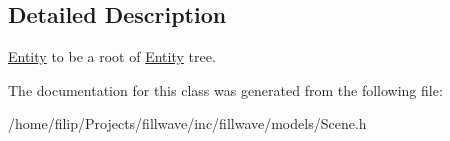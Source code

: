 \subsection{Detailed Description}
\hyperlink{classfillwave_1_1models_1_1Entity}{Entity} to be a root of \hyperlink{classfillwave_1_1models_1_1Entity}{Entity} tree. 

The documentation for this class was generated from the following file\+:\begin{DoxyCompactItemize}
\item 
/home/filip/\+Projects/fillwave/inc/fillwave/models/Scene.\+h\end{DoxyCompactItemize}
